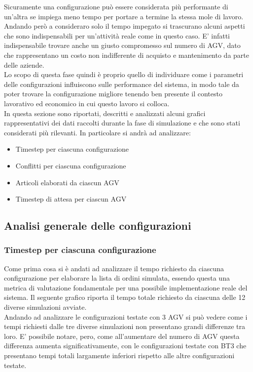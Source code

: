 \documentclass[12pt]{article}
\begin{document}
\noindent Sicuramente una configurazione può essere considerata più performante di un'altra se impiega meno tempo per portare a termine la stessa mole di lavoro. Andando però a consideraro solo il tempo impegato si trascurano alcuni aspetti che sono indispensabili per un'attività reale come in questo caso. E' infatti indispensabile trovare anche un giusto compromesso sul numero di AGV, dato che rappresentano un costo non indifferente di acquisto e mantenimento da parte delle aziende. \\

\noindent Lo scopo di questa fase quindi è proprio quello di individuare come i parametri delle configurazioni influiscono sulle performance del sistema, in modo tale da poter trovare la configurazione migliore tenendo ben presente il contesto lavorativo ed economico in cui questo lavoro si colloca. \\
\noindent In questa sezione sono riportati, descritti e analizzati alcuni grafici rappresentativi dei dati raccolti durante la fase di simulazione e che sono stati considerati più rilevanti. In particolare si andrà ad analizzare:\\

\begin{itemize}
\item Timestep per ciascuna configurazione
\item Conflitti per ciascuna configurazione
\item Articoli elaborati da ciascun AGV
\item Timestep di attesa per ciascun AGV
\end{itemize}

\newpage
\subsection{Analisi generale delle configurazioni}
\subsubsection{Timestep per ciascuna configurazione}
Come prima cosa si è andati ad analizzare il tempo richiesto da ciascuna configurazione per elaborare la lista di ordini simulata, essendo questa una metrica di valutazione fondamentale per una possibile implementazione reale del sistema. Il seguente grafico riporta il tempo totale richiesto da ciascuna delle 12 diverse simulazioni avviate. \\

\noindent Andando ad analizzare le configurazioni testate con 3 AGV si può vedere come i tempi richiesti dalle tre diverse simulazioni non presentano grandi differenze tra loro. E' possibile notare, pero, come all'aumentare del numero di AGV questa differenza aumenta significativamente, con le configurazioni testate con BT3 che presentano tempi totali largamente inferiori rispetto alle altre configurazioni testate.
\end{document}
